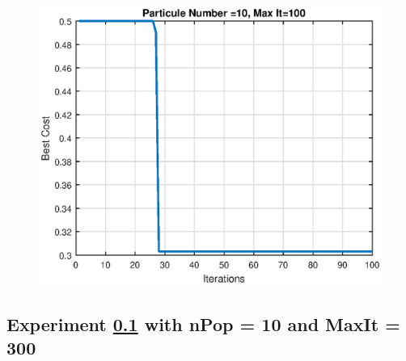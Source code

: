 \begin{figure}[H]
	\begin{minipage}[b]{0.5\linewidth}
	\centering
	\includegraphics[width=\textwidth]{../figures/res10100.eps}
	\caption{}
	\label{}
	\end{minipage}\hfill
	\begin{minipage}[b]{0.5\textwidth}
	
	\caption{}
	\label{}
	\end{minipage}
\end{figure}
\subsection{Experiment \ref{exp:exp101000} with nPop = 10 and MaxIt = 300}\label{exp:exp101000}
\pagebreak

